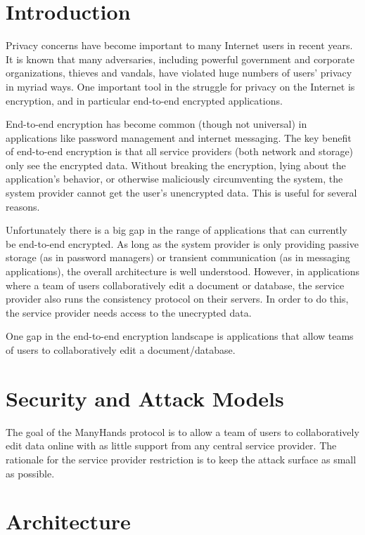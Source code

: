 \documentclass[pldi,10pt,preprint]{sigplanconf-pldi16}
\begin{document}
\section{Introduction}

Privacy concerns have become important to many Internet users in recent years.
It is known that many adversaries, including powerful government and corporate organizations, thieves and vandals, have violated huge numbers of users' privacy in myriad ways.
One important tool in the struggle for privacy on the Internet is encryption, and in particular end-to-end encrypted applications.

End-to-end encryption has become common (though not universal) in applications like password management and internet messaging.
The key benefit of end-to-end encryption is that all service providers (both network and storage) only see the encrypted data.
Without breaking the encryption, lying about the application's behavior, or otherwise maliciously circumventing the system, the system provider cannot get the user's unencrypted data.
This is useful for several reasons.

Unfortunately there is a big gap in the range of applications that can currently be end-to-end encrypted.
As long as the system provider is only providing passive storage (as in password managers) or transient communication (as in messaging applications), the overall architecture is well understood.
However, in applications where a team of users collaboratively edit a document or database, the service provider also runs the consistency protocol on their servers.
In order to do this, the service provider needs access to the unecrypted data.

One gap in the end-to-end encryption landscape is applications that allow teams of users to collaboratively edit a document/database.

\section{Security and Attack Models}

The goal of the ManyHands protocol is to allow a team of users to collaboratively edit data online with as little support from any central service provider.
The rationale for the service provider restriction is to keep the attack surface as small as possible.

\section{Architecture}
\end{document}

